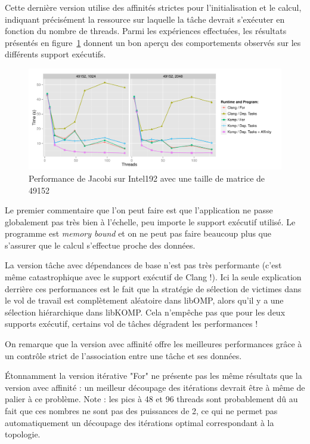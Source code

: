 \documentclass[parallelisme]{compas2017}
\begin{document}
Cette dernière version utilise des affinités strictes pour l'initialisation et le calcul,
indiquant précisément la ressource sur laquelle la tâche devrait s'exécuter en
fonction du nombre de threads.
Parmi les expériences effectuées, les résultats présentés en figure~\ref{fig:eval-jacobi}
donnent un bon aperçu des comportements observés sur les différents support exécutifs.


\begin{figure}[t]
  \centering
  \includegraphics[scale=0.55]{./graphs/jacobi_scale_iomp_komp.pdf}
  \caption{Performance de Jacobi sur Intel192 avec une taille de matrice de 49152}
\label{fig:eval-jacobi}
\end{figure}

Le premier commentaire que l'on peut faire est que l'application ne passe
globalement pas très bien à l'échelle, peu importe le support exécutif utilisé.
Le programme est \textit{memory bound} et on ne peut pas faire beaucoup plus
que s'assurer que le calcul s'effectue proche des données.

La version tâche avec dépendances de base n'est pas très performante (c'est même
catastrophique avec le support exécutif de Clang !). Ici la seule explication
derrière ces performances est le fait que la stratégie de sélection de victimes dans le vol de travail est complètement aléatoire
dans libOMP, alors qu'il y a une sélection hiérarchique dans libKOMP. Cela n'empêche pas
que pour les deux supports exécutif, certains vol de tâches dégradent les performances !

On remarque que la version avec affinité offre les meilleures performances grâce à un contrôle
strict de l'association entre une tâche et ses données.

Étonnamment la version itérative "For" ne présente pas les même résultats que la version
avec affinité : un meilleur découpage des itérations devrait être à même de palier
à ce problème. Note : les pics à 48 et 96 threads sont probablement dû au fait que
ces nombres ne sont pas des puissances de 2, ce qui ne permet pas automatiquement un découpage
des itérations optimal correspondant à la topologie.
\end{document}

